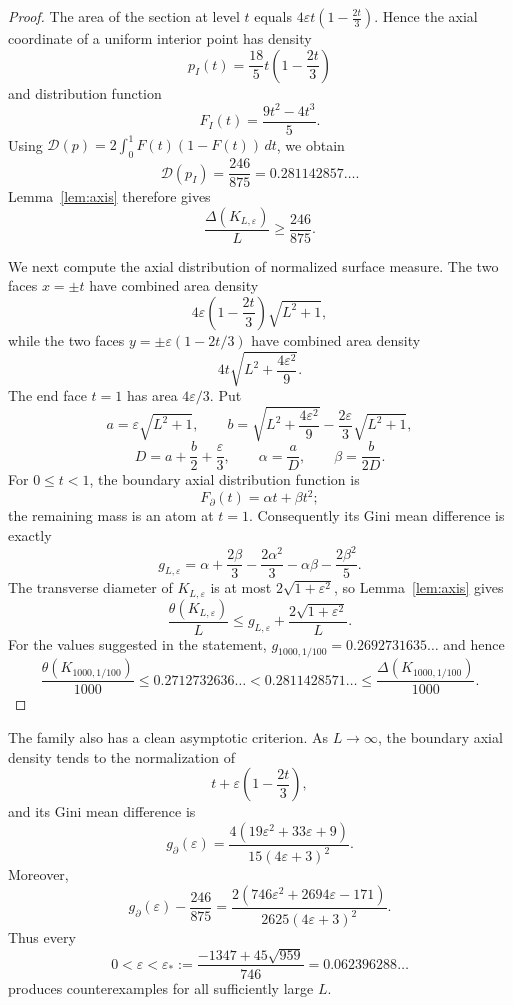 \documentclass[final,12pt]{elsarticle}
\numberwithin{equation}{section}
\theoremstyle{remark}
\newcommand{\Gini}{\mathcal D}
\theoremstyle{definition}
\begin{document}
\begin{proof}

The area of the section at level $t$ equals
$
4\varepsilon t\left(1-\frac{2t}{3}\right).
$
Hence the axial coordinate of a uniform interior point has density
$$
p_I(t)=\frac{18}{5}t\left(1-\frac{2t}{3}\right)
$$
and distribution function
$$
F_I(t)=\frac{9t^2-4t^3}{5}.
$$
Using $\Gini(p)=2\int_0^1F(t)(1-F(t))\,dt$, we obtain
$$
\Gini(p_I)=\frac{246}{875}=0.281142857\ldots.
$$
Lemma~\ref{lem:axis} therefore gives
$$
\frac{\Delta(K_{L,\varepsilon})}{L}\geq\frac{246}{875}.
$$

We next compute the axial distribution of normalized surface measure. The two faces $x=\pm t$ have combined area density
$$
4\varepsilon\left(1-\frac{2t}{3}\right)\sqrt{L^2+1},
$$
while the two faces $y=\pm\varepsilon(1-2t/3)$ have combined area density
$$
4t\sqrt{L^2+\frac{4\varepsilon^2}{9}}.
$$
The end face $t=1$ has area $4\varepsilon/3$. Put
$$
a=\varepsilon\sqrt{L^2+1},\qquad
b=\sqrt{L^2+\frac{4\varepsilon^2}{9}}-\frac{2\varepsilon}{3}\sqrt{L^2+1},
$$
$$
D=a+\frac b2+\frac{\varepsilon}{3},\qquad
\alpha=\frac aD,\qquad \beta=\frac{b}{2D}.
$$
For $0\leq t<1$, the boundary axial distribution function is
$$
F_{\partial}(t)=\alpha t+\beta t^2;
$$
the remaining mass is an atom at $t=1$. Consequently its Gini mean difference is exactly
$$
g_{L,\varepsilon}
=\alpha+\frac{2\beta}{3}-\frac{2\alpha^2}{3}-\alpha\beta-\frac{2\beta^2}{5}.
$$
The transverse diameter of $K_{L,\varepsilon}$ is at most $2\sqrt{1+\varepsilon^2}$, so Lemma~\ref{lem:axis} gives
$$
\frac{\theta(K_{L,\varepsilon})}{L}
\leq g_{L,\varepsilon}+\frac{2\sqrt{1+\varepsilon^2}}{L}.
$$
For the values suggested in the statement,
$
g_{1000,1/100}=0.2692731635\ldots
$
and hence
$$
\frac{\theta(K_{1000,1/100})}{1000}
\leq0.2712732636\ldots
<0.2811428571\ldots
\leq\frac{\Delta(K_{1000,1/100})}{1000}.
$$
\end{proof}




The family also has a clean asymptotic criterion. As $L\to\infty$, the boundary axial density tends to the normalization of
$$
t+\varepsilon\left(1-\frac{2t}{3}\right),
$$
and its Gini mean difference is
$$
g_{\partial}(\varepsilon)
=\frac{4(19\varepsilon^2+33\varepsilon+9)}{15(4\varepsilon+3)^2}.
$$
Moreover,
$$
g_{\partial}(\varepsilon)-\frac{246}{875}
=\frac{2(746\varepsilon^2+2694\varepsilon-171)}{2625(4\varepsilon+3)^2}.
$$
Thus every
$$
0<\varepsilon<\varepsilon_*:=\frac{-1347+45\sqrt{959}}{746}=0.062396288\ldots
$$
produces counterexamples for all sufficiently large $L$.
\end{document}
